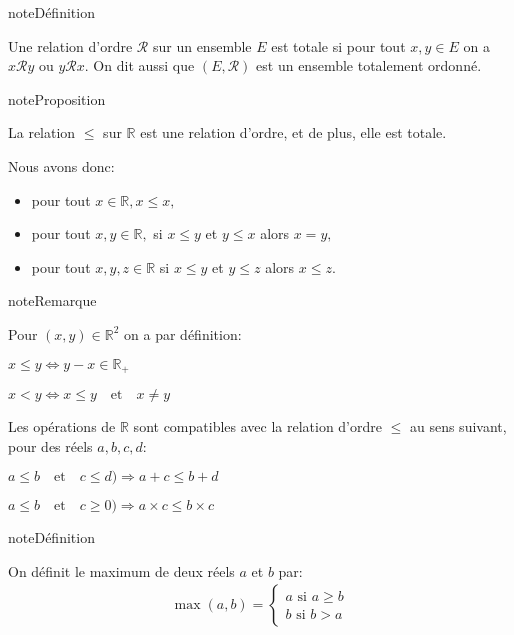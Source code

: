 \documentclass[letterpaper,10pt,french]{jupyterBook}
\begin{document}
\begin{sphinxadmonition}{note}{Définition}

\sphinxAtStartPar
Une relation d’ordre \(\mathcal{R}\) sur un ensemble \(E\) est totale si pour tout \(x, y\in E\) on a \(x\mathcal{R}y\) ou \(y\mathcal{R}x.\) On dit aussi que
\((E,\mathcal{R})\) est un ensemble totalement ordonné.
\end{sphinxadmonition}

\begin{sphinxadmonition}{note}{Proposition}

\sphinxAtStartPar
La relation \(\leq\) sur \(\mathbb{R}\) est une relation d’ordre, et de plus, elle est totale.
\end{sphinxadmonition}

\sphinxAtStartPar
Nous avons donc:
\begin{itemize}
\item {} 
\sphinxAtStartPar
pour tout \(x\in \mathbb{R}, x\leq x,\)

\item {} 
\sphinxAtStartPar
pour tout \(x, y \in \mathbb{R},\) si \(x\leq y\) et \(y\leq x\) alors \(x=y,\)

\item {} 
\sphinxAtStartPar
pour tout \(x, y, z\in\mathbb{R}\) si \(x \leq y\) et \(y \leq z\) alors \(x \leq z.\)

\end{itemize}

\begin{sphinxadmonition}{note}{Remarque}

\sphinxAtStartPar
Pour \((x, y)\in \mathbb{R}^{2}\) on a par définition:

\sphinxAtStartPar
\(x\leq y \Leftrightarrow y-x\in \mathbb{R}_{+}\)

\sphinxAtStartPar
\(x<y\Leftrightarrow x\leq y\quad\mbox{et}\quad x\neq y\)

\sphinxAtStartPar
Les opérations de \(\mathbb{R}\) sont compatibles avec la relation d’ordre \(\leq\) au sens suivant, pour des réels \(a, b,c, d:\)

\sphinxAtStartPar
\(a\leq b \quad\mbox{et}\quad c\leq d)\Rightarrow a+c\leq b+d\)

\sphinxAtStartPar
\(a\leq b \quad\mbox{et}\quad c\geq0)\Rightarrow a\times c\leq b\times c\)
\end{sphinxadmonition}

\begin{sphinxadmonition}{note}{Définition}

\sphinxAtStartPar
On définit le maximum de deux réels \(a\) et \(b\) par:
\begin{equation*}
\begin{split}
\max(a,b)=\left\{
\begin{array}{ll}
a\mbox{ si } a\geq b\\
b \mbox{ si } b>a
\end{array}
\right.
\end{split}
\end{equation*}\end{sphinxadmonition}
\end{document}
